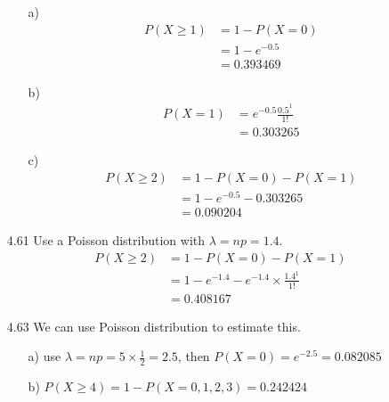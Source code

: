 \documentclass{article}
\begin{document}
\begin{itemize}
    \begin{itemize}
        \item [a)] \begin{align*}
            P(X\geq 1) &= 1-P(X=0)\\
            &=1-e^{-0.5}\\
            &=0.393469
        \end{align*}
        \item [b)]\begin{align*}
            P(X=1) &= e^{-0.5}\frac{0.5^1}{1!}\\
            &=0.303265
        \end{align*}
        \item [c)]\begin{align*}
            P(X\geq 2) &= 1-P(X=0)-P(X=1)\\
            &=1-e^{-0.5}-0.303265\\
            &=0.090204
        \end{align*}
    \end{itemize}
    \item [4.61] Use a Poisson distribution with \(\lambda = np = 1.4\).
    \begin{align*}
        P(X\geq2) &= 1-P(X=0)-P(X=1)\\
        &=1-e^{-1.4}-e^{-1.4}\times \frac{1.4^1}{1!}\\
        &=0.408167
    \end{align*}
    \item [4.63] We can use Poisson distribution to estimate this.
    \begin{itemize}
        \item [a)] use \(\lambda = np = 5\times \frac{1}{2}=2.5\), then \(P(X=0) = e^{-2.5} = 0.082085\)
        \item [b)] \(P(X\geq 4) = 1-P(X=0,1,2,3) = 0.242424\)
    \end{itemize}
\end{itemize}
\end{document}
